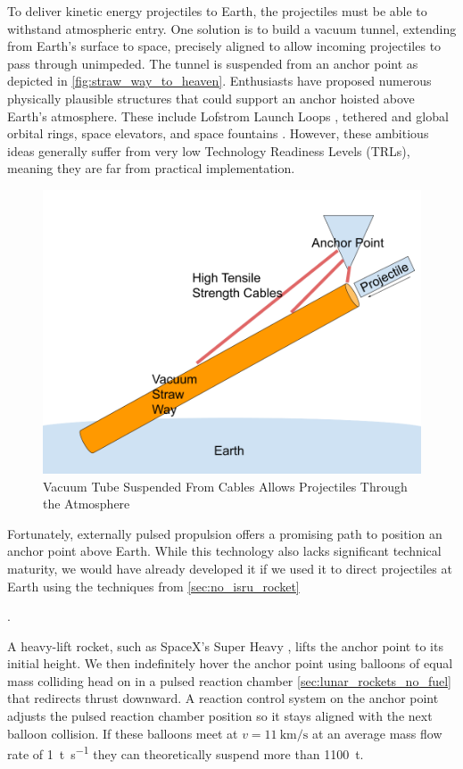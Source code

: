 \documentclass{article}
\begin{document}
{To deliver kinetic energy projectiles to Earth, the projectiles must be able to withstand atmospheric entry.  One solution is to build a vacuum tunnel, extending from Earth's surface to space, precisely aligned to allow incoming projectiles to pass through unimpeded.  The tunnel is suspended from an anchor point as depicted in \autoref{fig:straw_way_to_heaven}.   Enthusiasts have proposed numerous physically plausible structures that could support an anchor hoisted above Earth's atmosphere. These include Lofstrom Launch Loops \cite {lofstrom_loop}, tethered and global orbital rings, space elevators, and space fountains \cite{isaac_arthur_megastructure_complation}.  However, these ambitious ideas generally suffer from very low Technology Readiness Levels (TRLs), meaning they are far from practical implementation.

\begin{figure}[!htpb]
    \centering
    \includegraphics[width=0.5\linewidth]{images/Straw Way To Heaven.png}
    \caption{Vacuum Tube Suspended From Cables Allows Projectiles Through the Atmosphere}
    \label{fig:straw_way_to_heaven}
\end{figure}


Fortunately, externally pulsed propulsion offers a promising path to position an anchor point above Earth. While this technology also lacks significant technical maturity, we would have already developed it if we used it to direct projectiles at Earth using the techniques from \autoref{sec:no_isru_rocket}}.

A heavy-lift rocket, such as SpaceX's Super Heavy \cite{spacex_super_heavy}, lifts the anchor point to its initial height.  We then indefinitely hover the anchor point using balloons of equal mass colliding head on  in a pulsed reaction chamber \autoref{sec:lunar_rockets_no_fuel} that redirects thrust downward.  A reaction control system on the anchor point adjusts the pulsed reaction chamber position so it stays aligned with the next balloon collision.  If these balloons meet at $v=\SI{11}{\kilo\meter\per\second}$ at an average mass flow rate of \SI{1}{\tonne\per\second} they can theoretically suspend more than \SI{1100}{\tonne}.   
\end{document}
